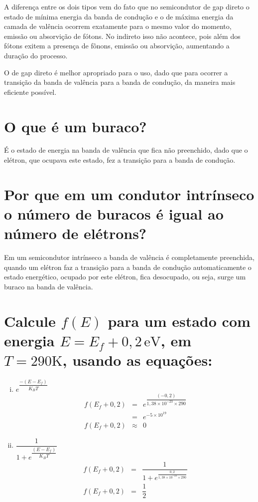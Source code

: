 A diferença entre os dois tipos vem do fato que no semicondutor de gap
direto o estado de  mínima energia da banda de condução  e o de máxima
energia da camada de valência ocorrem exatamente para o mesmo valor do
momento,  emissão  ou absorvição  de  fótons.   No indireto  isso  não
acontece, pois além dos fótons exitem a presença de fônons, emissão ou
absorvição, aumentando a duração do processo.


\noindent O de gap direto é melhor apropriado para o uso, dado que para ocorrer
a transição da banda de valência  para a banda de condução, da maneira
mais eficiente  possível.

\section*{O que é um buraco?}
\label{q14}

É o estado de energia na banda de valência que fica não preenchido,
dado que o elétron, que ocupava este estado, fez a transição para a
banda de condução.

\section*{Por que em um condutor intrínseco o número de buracos é
  igual ao número de elétrons?}
\label{q15}

Em um semicondutor intrínseco a banda de valência é completamente
preenchida, quando um elétron faz a transição para a banda de condução
automaticamente o estado energético, ocupado por este elétron, fica
desocupado, ou seja, surge um buraco na banda de valência.

\section*{Calcule $f(E)$ para um estado com energia $E = E_{f} + 0,2
  \, \si{\electronvolt}$, em $T = 290 \si{\kelvin}$, usando as equações:}
\label{q16}

\begin{enumerate}[i)]
\item $e^{\dfrac{-(E - E_{f})}{K_{B}T}}$
  \begin{eqnarray*}
    f(E_{f} + 0,2) & = & e^{{\dfrac{(-0,2)}
                         {1,38 \times 10^{-23} \times 290}}} \\
    \nonumber
                  & = & e^{-5 \times 10^{19}} \\ \nonumber
    f(E_{f} + 0,2) & \approx & 0
  \end{eqnarray*}
\item $\dfrac{1}{1 + e^{\dfrac{(E - E_{f})}{K_{B}T}}}$
  \begin{eqnarray*}
    f(E_{f} + 0,2) & = & \dfrac{1}{1 + e^{\frac{0,2}
                         {1,38 \times 10^{-23} \times 290}}} \\
    \nonumber
    f(E_{f} + 0,2) & = & \dfrac{1}{2} \nonumber
  \end{eqnarray*}
\end{enumerate}

\section*{}
\label{q17}